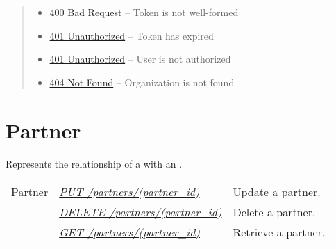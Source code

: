 \documentclass[letterpaper,10pt,english]{sphinxmanual}
\begin{document}
\begin{fulllineitems}
\begin{quote}
\begin{description}
\begin{itemize}
\item {} 
\href{http://www.w3.org/Protocols/rfc2616/rfc2616-sec10.html\#sec10.4.1}{400 Bad Request} -- Token is not well-formed

\item {} 
\href{http://www.w3.org/Protocols/rfc2616/rfc2616-sec10.html\#sec10.4.2}{401 Unauthorized} -- Token has expired

\item {} 
\href{http://www.w3.org/Protocols/rfc2616/rfc2616-sec10.html\#sec10.4.2}{401 Unauthorized} -- User is not authorized

\item {} 
\href{http://www.w3.org/Protocols/rfc2616/rfc2616-sec10.html\#sec10.4.5}{404 Not Found} -- Organization is not found

\end{itemize}

\end{description}\end{quote}

\end{fulllineitems}



\section{Partner}
\label{\detokenize{resources/partner::doc}}\label{\detokenize{resources/partner:id1}}\label{\detokenize{resources/partner:partner}}
Represents the relationship of a {\hyperref[\detokenize{resources/user:user}]{}} with an {\hyperref[\detokenize{resources/organization:organization}]{}}.

\noindent\begin{tabulary}{\linewidth}{|L|L|L|}
\hline
{}\relax &\relax &\relax \\
\hline
Partner
&
{\hyperref[\detokenize{resources/partner:put--partners-(partner_id)}]{\emph{PUT /partners/(partner\_id)}}}
&
Update a partner.
\\
\hline&
{\hyperref[\detokenize{resources/partner:delete--partners-(partner_id)}]{\emph{DELETE /partners/(partner\_id)}}}
&
Delete a partner.
\\
\hline&
{\hyperref[\detokenize{resources/partner:get--partners-(partner_id)}]{\emph{GET /partners/(partner\_id)}}}
&
Retrieve a partner.
\\
\hline\end{tabulary}
\end{document}

